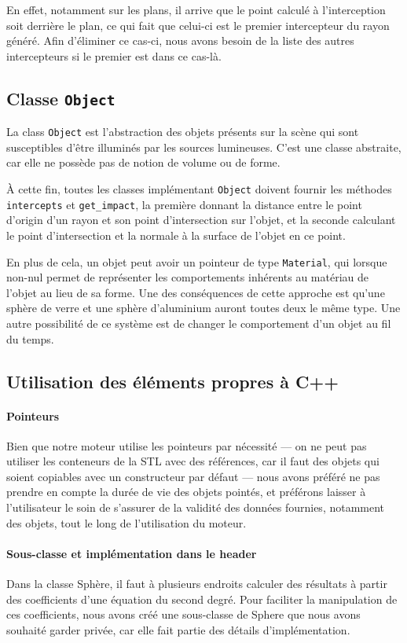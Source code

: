 \documentclass{article}
\begin{document}
En effet, notamment sur les plans, il arrive que le point calculé à l'interception soit derrière
le plan, ce qui fait que celui-ci est le premier intercepteur du rayon généré. Afin d'éliminer ce
cas-ci, nous avons besoin de la liste des autres intercepteurs si le premier est dans ce cas-là.

\subsection{Classe \texttt{Object}}

La class \verb,Object, est l'abstraction des objets présents sur la scène qui sont susceptibles
d'être illuminés par les sources lumineuses. C'est une classe abstraite, car elle ne possède pas
de notion de volume ou de forme.

À cette fin, toutes les classes implémentant \verb,Object, doivent fournir les méthodes \verb,intercepts,
et \verb,get_impact,, la première donnant la distance entre le point d'origin d'un rayon et son point
d'intersection sur l'objet, et la seconde calculant le point d'intersection et la normale à la surface
de l'objet en ce point.

En plus de cela, un objet peut avoir un pointeur de type \verb,Material,, qui lorsque non-nul permet
de représenter les comportements inhérents au matériau de l'objet au lieu de sa forme. Une des conséquences
de cette approche est qu'une sphère de verre et une sphère d'aluminium auront toutes deux le même type. Une
autre possibilité de ce système est de changer le comportement d'un objet au fil du temps.

\subsection{Utilisation des éléments propres à C++}
\paragraph{Pointeurs}
Bien que notre moteur utilise les pointeurs par nécessité — on ne peut pas utiliser les conteneurs de la
STL avec des références, car il faut des objets qui soient copiables avec un constructeur par défaut —
nous avons préféré ne pas prendre en compte la durée de vie des objets pointés, et préférons laisser à
l'utilisateur le soin de s'assurer de la validité des données fournies, notamment des objets, tout le long
de l'utilisation du moteur.

\paragraph{Sous-classe et implémentation dans le header}
Dans la classe Sphère, il faut à plusieurs endroits calculer des résultats à partir des coefficients d'une
équation du second degré. Pour faciliter la manipulation de ces coefficients, nous avons créé une sous-classe
de Sphere que nous avons souhaité garder privée, car elle fait partie des détails d'implémentation.
\end{document}
